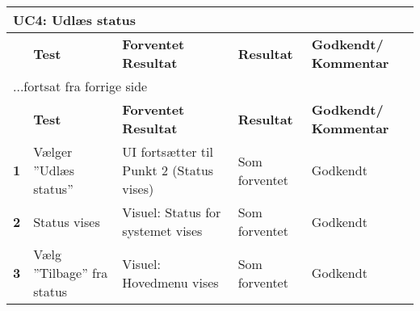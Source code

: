 
\begin{center}
\begin{longtable}{|p{}|p{}|p{}|p{}|p{}|} %
\hline
\multicolumn{5}{|l|}{\textbf{UC4: Udlæs status}} \\ \hline
\multicolumn{1}{|c|}{} &
\textbf{Test} &
\textbf{Forventet \newline Resultat} &
\textbf{Resultat} &
\textbf{Godkendt/ \newline Kommentar} \\ \hline 
\endfirsthead

\multicolumn{5}{l}{...fortsat fra forrige side} \\ \hline 
\multicolumn{1}{|c|}{} &
\textbf{Test} &
\textbf{Forventet \newline Resultat} &
\textbf{Resultat} &
\textbf{Godkendt/ \newline Kommentar} \\ \hline 
\endhead


\textbf{1} 
&Vælger ''Udlæs status'' 
&UI fortsætter til Punkt 2 (Status vises) 
&Som \newline forventet
&Godkendt
 \\\hline

\textbf{2} &
Status vises &
Visuel: Status for systemet vises
&Som \newline forventet
&Godkendt
 \\\hline
\textbf{3} &
Vælg ''Tilbage'' fra status &
Visuel: Hovedmenu vises
&Som \newline forventet
&Godkendt
 \\\hline
	\end{longtable}
	\label{ATUC4} 
\end{center}